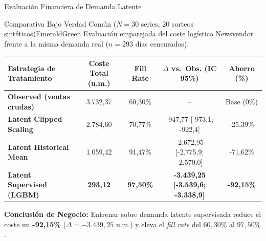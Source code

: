 \documentclass[aspectratio=169, 10pt]{beamer}
\begin{document}
\begin{frame}{Evaluación Financiera de Demanda Latente}
  \begin{statbox}{Comparativa Bajo Verdad Común ($N=30$ series, 20 sorteos sintéticos)}{EmeraldGreen}
    \centering\small
    Evaluación emparejada del coste logístico Newsvendor frente a la misma demanda real ($n=293$ días censurados).
  \end{statbox}
  \vspace{0.05cm}
  \begin{table}[h]
    \centering
    \scriptsize
    \begin{tabular}{lcccc}
      \toprule
      \textbf{Estrategia de Tratamiento} & \textbf{Coste Total (u.m.)} & \textbf{Fill Rate} & \textbf{$\Delta$ vs.\ Obs. (IC 95\%)} & \textbf{Ahorro (\%)} \\
      \midrule
      \textbf{Observed (ventas crudas)} & 3.732,37 & 60,30\% & -- & Base (0\%) \\
      \textbf{Latent Clipped Scaling} & 2.784,60 & 70,77\% & -947,77 [-973,1; -922,4] & -25,39\% \\
      \textbf{Latent Historical Mean} & 1.059,42 & 91,47\% & -2.672,95 [-2.775,9; -2.570,0] & -71,62\% \\
      \textbf{Latent Supervised (LGBM)} & \textbf{293,12} & \textbf{97,50\%} & \textbf{-3.439,25 [-3.539,6; -3.338,9]} & \textbf{-92,15\%} \\
      \bottomrule
    \end{tabular}
  \end{table}

  \begin{herocard}
    \small \textbf{Conclusión de Negocio:} Entrenar sobre demanda latente supervisada reduce el coste un \textbf{-92,15\%} ($\Delta = -3.439{,}25$ u.m.) y eleva el \textit{fill rate} del $60{,}30\%$ al $97{,}50\%$.
  \end{herocard}
\end{frame}
\end{document}
